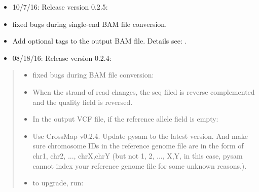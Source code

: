\documentclass[letterpaper,10pt,english]{sphinxmanual}
\begin{document}
\begin{itemize}
\item {} 
10/7/16: Release version 0.2.5:

\end{itemize}
\begin{itemize}
\item {} 
fixed bugs during single-end BAM file conversion.

\item {} 
Add optional tags to the output BAM file. Details see: {\hyperref[\detokenize{index:bam-conversion}]{}}.

\end{itemize}
\begin{itemize}
\item {} 
08/18/16: Release version 0.2.4:

\end{itemize}
\begin{quote}
\begin{itemize}
\item {} 
fixed bugs during BAM file conversion:

\end{itemize}
\begin{itemize}
\item {} 
When the strand of read changes, the seq filed is reverse complemented and the quality field is reversed.

\end{itemize}
\begin{itemize}
\item {} 
In the output VCF file, if the reference allele field is empty:

\end{itemize}
\begin{itemize}
\item {} 
Use CrossMap v0.2.4. Update pysam to the latest version. And make sure chromosome IDs in the reference genome file are in the form of \sphinxquotedblleft{}chr1\sphinxquotedblright{}, \sphinxquotedblleft{}chr2\sphinxquotedblright{}, ..., \sphinxquotedblleft{}chrX\sphinxquotedblright{},\sphinxquotedblright{}chrY\sphinxquotedblright{} (but not \sphinxquotedblleft{}1\sphinxquotedblright{}, \sphinxquotedblleft{}2\sphinxquotedblright{}, ..., \sphinxquotedblleft{}X\sphinxquotedblright{},\sphinxquotedblright{}Y\sphinxquotedblright{}, in this case, pysam cannot index your reference genome file for some unknown reasons.).

\end{itemize}
\begin{itemize}
\item {} 
to upgrade, run: 

\end{itemize}
\end{quote}
\end{document}
